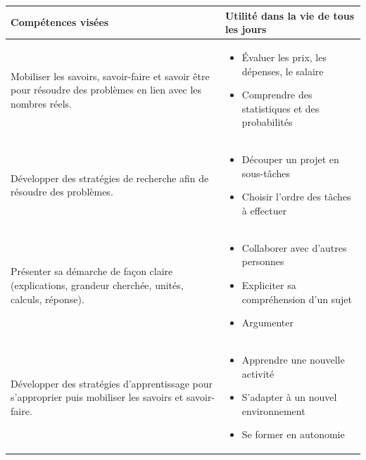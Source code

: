 \def\arraystretch{1.6}
\begin{tabularx}{\textwidth}{|>{\raggedright\arraybackslash}X|>{\raggedright\arraybackslash}X|}
\hline
\cellcolor{themeNO!30}Compétences visées & \cellcolor{themeNO!30}Utilité dans la vie de tous les jours \\
\hline
Mobiliser les savoirs, savoir-faire et savoir être pour résoudre des problèmes en lien avec les nombres réels.
&\vspace{-1em}
\begin{itemize}[leftmargin=*, itemsep=2pt, topsep=0pt, partopsep=0pt, parsep=0pt, label=$\triangleright$]
    \item Évaluer les prix, les dépenses, le salaire
    \item Comprendre des statistiques et des probabilités
\end{itemize} \\
\hline
 
Développer des stratégies de recherche afin de résoudre des problèmes.
&\vspace{-1em}
\begin{itemize}[leftmargin=*, itemsep=2pt, topsep=0pt, label=$\triangleright$]
    \item Découper un projet en sous-tâches
    \item Choisir l'ordre des tâches à effectuer
\end{itemize} \\
\hline
 
Présenter sa démarche de façon claire (explications, grandeur cherchée, unités, calculs, réponse).
&\vspace{-1em}
\begin{itemize}[leftmargin=*, itemsep=2pt, topsep=0pt, label=$\triangleright$]
    \item Collaborer avec d'autres personnes
    \item Expliciter sa compréhension d'un sujet
    \item Argumenter
\end{itemize} \\
\hline
 
Développer des stratégies d'apprentissage pour s'approprier puis mobiliser les savoirs et savoir-faire.
&\vspace{-1em}
\begin{itemize}[leftmargin=*, itemsep=2pt, topsep=0pt, label=$\triangleright$]
    \item Apprendre une nouvelle activité %
    \item S'adapter à un nouvel environnement %
    \item Se former en autonomie %
\end{itemize} \\
\hline
 

\end{tabularx}
